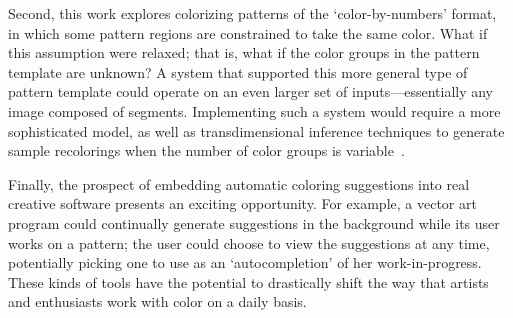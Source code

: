 Second, this work explores colorizing patterns of the `color-by-numbers' format, in which some pattern regions are constrained to take the same color. What if this assumption were relaxed; that is, what if the color groups in the pattern template are unknown? A system that supported this more general type of pattern template could operate on an even larger set of inputs---essentially any image composed of segments. Implementing such a system would require a more sophisticated model, as well as transdimensional inference techniques to generate sample recolorings when the number of color groups is variable~\cite{YiTingLARJ}.

Finally, the prospect of embedding automatic coloring suggestions into real creative software presents an exciting opportunity. For example, a vector art program could continually generate suggestions in the background while its user works on a pattern; the user could choose to view the suggestions at any time, potentially picking one to use as an `autocompletion' of her work-in-progress. These kinds of tools have the potential to drastically shift the way that artists and enthusiasts work with color on a daily basis. 